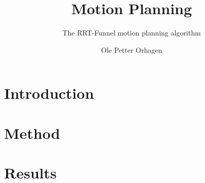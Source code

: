 \documentclass[a4paper, oneside, final]{memoir} %
\title{Motion Planning}
\author{Ole Petter Orhagen}
\subtitle{The RRT-Funnel motion planning algorithm}
\begin{document}
    \mnfrontpage{}
    \frontmatter        %
    
    
    
    
    \cleartorecto{}
    \tableofcontents    %
    \cleartorecto{}
    \listoffigures      %
    \cleartorecto{}
    \listoftables       %
    \mainmatter{}       %
    \part{Introduction}
    
    
    
    
    
    \part{Method}
    
    \part{Results}
    
    
    
    \appendix           %
    \appendixpage       %
    
    
    \backmatter         %
    \printbibliography
\end{document}
